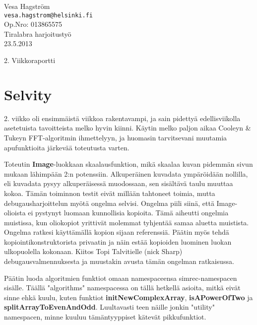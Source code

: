 \documentclass[12pt,a4paper]{report}
\author{Vesa Hagström}
\begin{document}
    \renewcommand{\bibname}{Viitteet}

	\begin{titlepage}
    \label{Title}
	\begin{flushleft}
		\hfill Vesa Hagström 											\\
		\hfill \texttt{vesa.hagstrom@helsinki.fi} 						\\
		\hfill Op.Nro: 013865575											\\
		\hfill Tiralabra harjoitustyö									\\
		\hfill 23.5.2013													\\
	\end{flushleft}

	\vfill

	\begin{center}
		\huge{2. Viikkoraportti}
	\end{center}

	\vfill

	\end{titlepage}

    \section*{Selvity}
    2. viikko oli ensimmäistä viikkoa rakentavampi, ja sain pidettyä edellisviikolla asetetuista tavoitteista melko hyvin kiinni. Käytin melko paljon aikaa Cooleyn \& Tukeyn FFT-algoritmin ihmettelyyn, ja huomasin tarvitsevani muutamia apufunktioita järkevää toteutusta varten. 
    
    Toteutin \textbf{Image}-luokkaan skaalausfunktion, mikä skaalaa kuvan pidemmän sivun mukaan lähimpään 2:n potenssiin. Alkuperäinen kuvadata ympäröidään nollilla, eli kuvadata pysyy alkuperäisessä muodossaan, sen sisältävä taulu muuttaa kokoa. Tämän toiminnon testit eivät millään tahtoneet toimia, mutta debugausharjoittelun myötä ongelma selvisi. Ongelma piili siinä, että Image-olioista ei pystynyt luomaan kunnollisia kopioita. Tämä aiheutti ongelmia muistissa, kun oliokopiot yrittivät molemmat tyhjentää samaa aluetta muistista. Ongelma ratkesi käyttämällä kopion sijaan referenssiä. Päätin myös tehdä kopiointikonstruktorista privaatin ja näin estää kopioiden luominen luokan ulkopuolella kokonaan. Kiitos Topi Talvitielle (nick Sharp) debugausvalmennuksesta ja muustakin avusta tämän ongelman ratkaisussa.
    
    Päätin luoda algoritmien funktiot omaan namespaceensa simrec-namespacen sisälle. Täällä "algorithms" namespacessa on tällä hetkellä asioita, mitkä eivät sinne ehkä kuulu, kuten funktiot \textbf{initNewComplexArray}, \textbf{isAPowerOfTwo} ja \textbf{splitArrayToEvenAndOdd}. Luultavasti teen näille jonkin "utility" namespacen, minne kuuluu tämäntyyppiset kätevät pikkufunktiot. 
\end{document}
